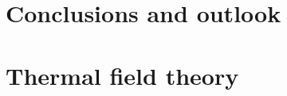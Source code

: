 \documentclass{book}
\begin{document}
\chapter{Conclusions and outlook}
\label{chpater:conclusion and outlook}



\appendix

\chapter{Thermal field theory}
\label{appendix:thermal field theory}














\printbibliography
\end{document}
